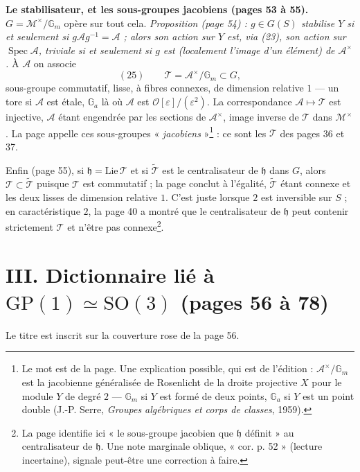 \documentclass[11pt,a4paper]{article}
\begin{document}
\textbf{Le stabilisateur, et les sous-groupes jacobiens (pages 53 à 55).}
$G = \mathcal{M}^{\times}/\mathbb{G}_m$ opère sur tout cela. \emph{Proposition (page 54) :
$g \in G(S)$ stabilise $Y$ si et seulement si $g\mathcal{A} g^{-1} = \mathcal{A}$ ; alors son
action sur $Y$ est, via (23), son action sur $\operatorname{Spec}\mathcal{A}$, triviale si et
seulement si $g$ est (localement l'image d'un élément) de $\mathcal{A}^{\times}$.} À
$\mathcal{A}$ on associe
\[
  (25) \qquad \mathcal{T} = \mathcal{A}^{\times}/\mathbb{G}_m \subset G ,
\]
sous-groupe commutatif, lisse, à fibres connexes, de dimension relative $1$ — un
tore si $\mathcal{A}$ est étale, $\mathbb{G}_a$ là où $\mathcal{A}$ est
$\mathcal{O}[\varepsilon]/(\varepsilon^2)$. La correspondance $\mathcal{A} \mapsto \mathcal{T}$ est
injective, $\mathcal{A}$ étant engendrée par les sections de $\mathcal{A}^{\times}$, image
inverse de $\mathcal{T}$ dans $\mathcal{M}^{\times}$. La page appelle ces sous-groupes
« \emph{jacobiens} »\footnote{Le mot est de la page. Une explication possible, qui
est de l'édition : $\mathcal{A}^{\times}/\mathbb{G}_m$ est la jacobienne généralisée de
Rosenlicht de la droite projective $X$ pour le module $Y$ de degré $2$ — $\mathbb{G}_m$
si $Y$ est formé de deux points, $\mathbb{G}_a$ si $Y$ est un point double (J.-P.
Serre, \emph{Groupes algébriques et corps de classes}, 1959).} : ce sont les
$\mathcal{T}$ des pages 36 et 37.

Enfin (page 55), si $\mathfrak{h} = \mathrm{Lie}\,\mathcal{T}$ et si $\widetilde{\mathcal{T}}$ est le
centralisateur de $\mathfrak{h}$ dans $G$, alors $\mathcal{T} \subset \widetilde{\mathcal{T}}$ puisque
$\mathcal{T}$ est commutatif ; la page conclut à l'égalité, $\widetilde{\mathcal{T}}$ étant
connexe et les deux lisses de dimension relative $1$. C'est juste lorsque $2$ est
inversible sur $S$ ; en caractéristique $2$, la page 40 a montré que le
centralisateur de $\mathfrak{h}$ peut contenir strictement $\mathcal{T}$ et n'être pas
connexe\footnote{La page identifie ici « le sous-groupe jacobien que
$\mathfrak{h}$ définit » au centralisateur de $\mathfrak{h}$. Une note marginale
oblique, « cor. p. 52 » (lecture incertaine), signale peut-être une correction à
faire.}.

\section*{III. Dictionnaire lié à $\mathrm{GP}(1) \simeq \mathrm{SO}(3)$ (pages 56 à 78)}

Le titre est inscrit sur la couverture rose de la page 56.
\end{document}
